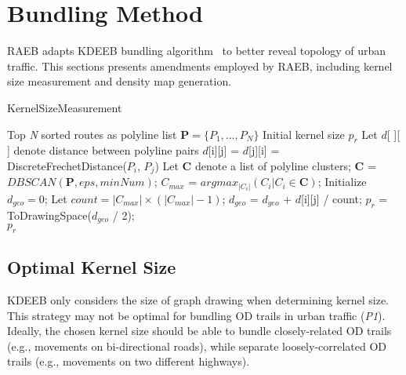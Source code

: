 \section{Bundling Method}
\label{sec:bundling}

RAEB adapts KDEEB bundling algorithm~\cite{hurter2012graph} to better reveal topology of urban traffic.
This sections presents amendments employed by RAEB, including kernel size measurement and density map generation.

\begin{algorithm}[b]
	\caption{KernelSizeMeasurement}\label{al:kernel_size_measurement}
	\begin{algorithmic}[1]
		\Require Top \textit{N} sorted routes as polyline list $\textbf{P} = \{P_1, ..., P_N\}$
		\Ensure Initial kernel size $p_r$		
		\State Let $d$[ ][ ] denote distance between polyline pairs
			\State $d$[i][j] = $d$[j][i] = DiscreteFrechetDistance($P_i$, $P_j$)
			\EndFor
		\EndFor
		\State Let \textbf{C} denote a list of polyline clusters;
		\State \textbf{C} = $DBSCAN(\textbf{P}, eps, minNum)$;
		\State $C_{max}$ = $argmax_{|C_i|}(C_i | C_i \in \textbf{C})$;
		\State Initialize $d_{geo} = 0$;
		\State Let $count = |C_{max}| \times (|C_{max}| - 1)$;
				\State $d_{geo}$ = $d_{geo}$ + $d$[i][j] / count;
			\EndFor
		\EndFor
		\State $p_r$ = ToDrawingSpace($d_{geo}$ / 2); \\
		\Return $p_r$
	\end{algorithmic}
\end{algorithm}

\subsection{Optimal Kernel Size}
\label{ssec:kernel_size}
KDEEB only considers the size of graph drawing when determining kernel size.
This strategy may not be optimal for bundling OD trails in urban traffic (\textit{P1}).
Ideally, the chosen kernel size should be able to bundle closely-related OD trails (e.g., movements on bi-directional roads), while separate loosely-correlated OD trails (e.g., movements on two different highways).

